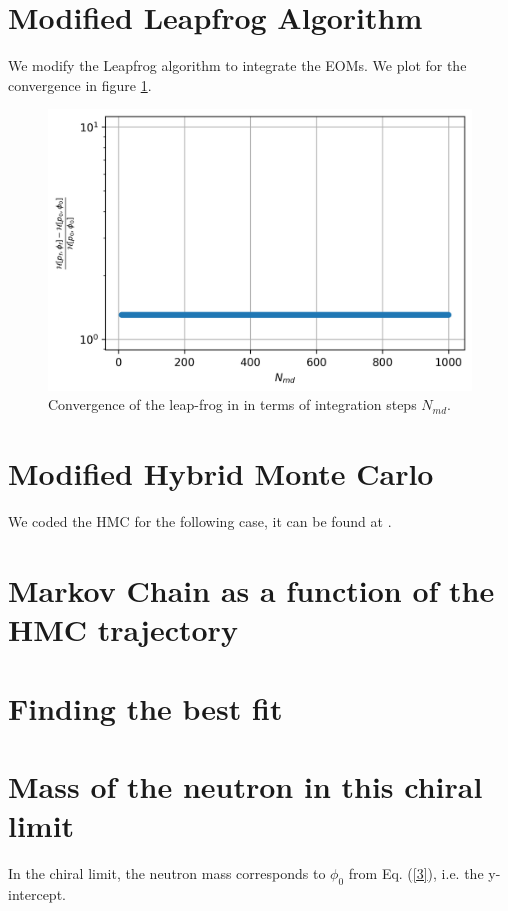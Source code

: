 \documentclass{cernatsnote}
\begin{document}
\section{Modified Leapfrog Algorithm}
We modify the Leapfrog algorithm to integrate the EOMs. We plot for the convergence in figure \ref{fig:leap}.
\begin{figure}[H]
    \centering
    \includegraphics[scale = 0.4]{images/h_v_n.png}
    \caption{Convergence of the leap-frog in in terms of integration steps $N_{md}$.}
    \label{fig:leap}
\end{figure}
\section{Modified Hybrid Monte Carlo}
We coded the HMC for the following case, it can be found at \cite{github}.

\section{Markov Chain as a function of the HMC trajectory}

\section{Finding the best fit}
\section{Mass of the neutron in this chiral limit}
In the chiral limit, the neutron mass corresponds to $\phi_0$ from Eq. (\ref{3}), i.e. the y-intercept.


\end{document}
